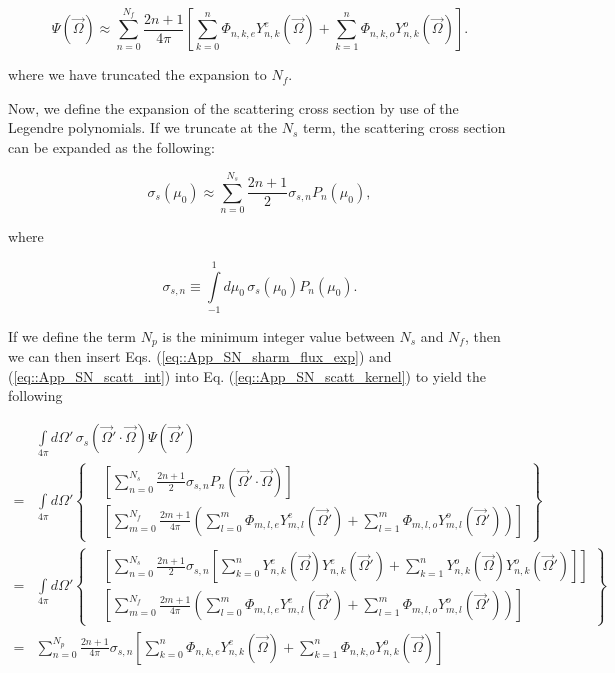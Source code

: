 \begin{equation}
\label{eq::App_SN_sharm_flux_exp}
\Psi(\vec{\Omega}) \approx \sum^{N_f}_{n=0} \frac{2n+1}{4 \pi} \left[ \sum_{k=0}^{n} \Phi_{n,k,e} Y^e_{n,k} (\vec{\Omega}) + \sum_{k=1}^{n} \Phi_{n,k,o} Y^o_{n,k} (\vec{\Omega})  \right] .
\end{equation}

\noindent where we have truncated the expansion to $N_f$. 

Now, we define the expansion of the scattering cross section by use of the Legendre polynomials. If we truncate at the $N_s$ term, the scattering cross section can be expanded as the following:

\begin{equation}
\label{eq::App_SN_scatt_exp}
\sigma_s (\mu_0) \approx \sum_{n=0}^{N_s} \frac{2n+1}{2} \sigma_{s,n} P_n (\mu_0) ,
\end{equation}

\noindent where 

\begin{equation}
\label{eq::App_SN_scatt_int}
\sigma_{s,n} \equiv \int\limits_{-1}^{1} d \mu_0 \, \sigma_s (\mu_0) P_n (\mu_0).
\end{equation}

If we define the term $N_p$ is the minimum integer value between $N_s$ and $N_f$, then we can then insert Eqs. (\ref{eq::App_SN_sharm_flux_exp}) and (\ref{eq::App_SN_scatt_int}) into Eq. (\ref{eq::App_SN_scatt_kernel}) to yield the following

\begin{equation}
\label{eq::App_SN_scatt_kernel_inserted}
\begin{aligned}
&\int\limits_{4 \pi} d \Omega' \, \sigma_s (\vec{\Omega}' \cdot \vec{\Omega}) \Psi (\vec{\Omega}')\\
= &\int\limits_{4 \pi} d \Omega'
\left\{ \begin{aligned}
&\left[\sum_{n=0}^{N_s} \frac{2n+1}{2} \sigma_{s,n} P_n (\vec{\Omega}' \cdot \vec{\Omega}) \right] \\
  &\left[\sum^{N_f}_{m=0} \frac{2m+1}{4 \pi} \left( \sum_{l=0}^{m} \Phi_{m,l,e} Y^e_{m,l} (\vec{\Omega}') + \sum_{l=1}^{m} \Phi_{m,l,o} Y^o_{m,l} (\vec{\Omega}')  \right) \right]
\end{aligned} \right\} \\
= &\int\limits_{4 \pi} d \Omega'
\left\{ \begin{aligned}
&\left[\sum_{n=0}^{N_s} \frac{2n+1}{2} \sigma_{s,n}\left[ \sum_{k=0}^{n} Y^e_{n,k} (\vec{\Omega}) Y^e_{n,k} (\vec{\Omega}') + \sum_{k=1}^{n} Y^o_{n,k} (\vec{\Omega}) Y^o_{n,k} (\vec{\Omega}') \right] \right]\\
  &\left[\sum^{N_f}_{m=0} \frac{2m+1}{4 \pi} \left( \sum_{l=0}^{m} \Phi_{m,l,e} Y^e_{m,l} (\vec{\Omega}') + \sum_{l=1}^{m} \Phi_{m,l,o} Y^o_{m,l} (\vec{\Omega}')  \right) \right]
\end{aligned} \right\} \\
=&\sum_{n=0}^{N_p} \frac{2n+1}{4 \pi}\sigma_{s,n} \left[  \sum_{k=0}^{n} \Phi_{n,k,e} Y^e_{n,k} (\vec{\Omega}) + \sum_{k=1}^{n} \Phi_{n,k,o} Y^o_{n,k} (\vec{\Omega})  \right]
\end{aligned}
\end{equation}

